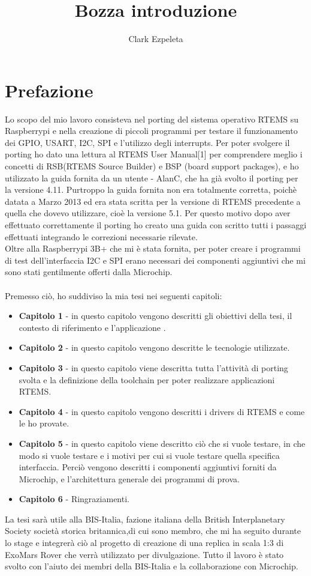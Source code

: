\documentclass[a4paper,12pt,titlepage,oneside]{book}
\title{Bozza introduzione}
\author{Clark Ezpeleta}
\begin{document}
\maketitle
\newpage
\chapter*{Prefazione}

Lo scopo del mio lavoro consisteva nel porting del sistema operativo RTEMS su Raspberrypi e nella creazione di piccoli programmi per testare il funzionamento dei GPIO, USART, I2C, SPI e l'utilizzo degli interrupts.
Per poter svolgere il porting ho dato una lettura al RTEMS User Manual[1] per comprendere meglio i concetti di RSB(RTEMS Source Builder) e BSP (board support packages), e ho utilizzato la guida fornita da un utente - AlanC,  che ha già svolto il porting per la versione 4.11.
Purtroppo la guida fornita non era totalmente corretta, poichè datata a Marzo 2013 ed era stata scritta per la versione di RTEMS precedente a quella che dovevo utilizzare, cioè la versione 5.1. 
Per questo motivo dopo aver effettuato correttamente il porting ho creato una guida con scritto tutti i passaggi effettuati integrando le correzioni necessarie rilevate. \\
Oltre alla Raspberrypi 3B+ che mi è stata fornita, per poter creare i programmi di test dell'interfaccia I2C e SPI erano necessari dei componenti aggiuntivi che mi sono stati gentilmente offerti dalla Microchip.\\\\
Premesso ciò, ho suddiviso la mia tesi nei seguenti capitoli:

\begin{itemize}
    \item \textbf{Capitolo 1} - in questo capitolo vengono descritti gli obiettivi della tesi, il contesto di riferimento e l'applicazione .
    \item \textbf{Capitolo 2} - in questo capitolo vengono descritte le tecnologie utilizzate.
    \item \textbf{Capitolo 3} - in questo capitolo viene descritta tutta l'attività di porting svolta e la definizione della toolchain per poter realizzare applicazioni RTEMS.
    \item \textbf{Capitolo 4} - in questo capitolo vengono descritti i drivers di RTEMS e come le ho provate.
    \item \textbf{Capitolo 5} - in questo capitolo viene descritto ciò che si vuole testare, in che modo si vuole testare e i motivi per cui si vuole testare quella specifica interfaccia. Perciò vengono descritti i componenti aggiuntivi forniti da Microchip, e l'architettura generale dei programmi di prova.
    \item \textbf{Capitolo 6} - Ringraziamenti.
    \end{itemize} 
La tesi sarà utile alla BIS-Italia, fazione italiana della British Interplanetary Society società storica britannica,di cui sono membro, che mi ha seguito durante lo stage e integrerà ciò al progetto di creazione di una replica in scala 1:3 di ExoMars Rover che verrà utilizzato per divulgazione.
Tutto il lavoro è stato svolto con l'aiuto dei membri della BIS-Italia e la collaborazione con Microchip. 
\end{document}
